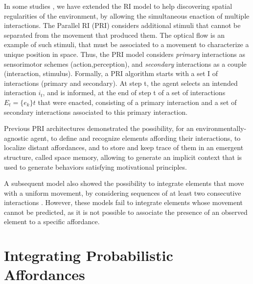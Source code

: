 \documentclass[conference]{IEEEtran}
\begin{document}
In some studies \cite{}, we have extended the RI model to help discovering spatial regularities of the environment, by allowing the simultaneous enaction of multiple interactions. 
The Parallel RI (PRI) considers additional stimuli that cannot be separated from the movement that produced them. 
The optical flow is an example of such stimuli, that must be associated to a movement to characterize a unique position in space. 
Thus, the PRI model considers \textit{primary} interactions as sensorimotor schemes (action,perception), and \textit{secondary} interactions as a couple (interaction, stimulus). 
Formally, a PRI algorithm starts with a set I of interactions (primary and secondary). 
At step t, the agent selects an intended interaction $i_t$, and is informed, at the end of step t of a set of interactions $E_t=\{e_k\}t$ that were enacted, consisting of a primary interaction and a set of secondary interactions associated to this primary interaction.

Previous PRI architectures demonstrated the possibility, for an environmentally-agnostic agent, to define and recognize elements affording their interactions, to localize distant affordances, and to store and keep trace of them in an emergent structure, called space memory, allowing to generate an implicit context that is used to generate behaviors satisfying motivational principles. 

A subsequent model also showed the possibility to integrate elements that move with a uniform movement, by considering sequences of at least two consecutive interactions \cite{gay:dynamic}. However, these models fail to integrate elements whose movement cannot be predicted, as it is not possible to associate the presence of an observed element to a specific affordance.



\section{Integrating Probabilistic Affordances}

\end{document}
